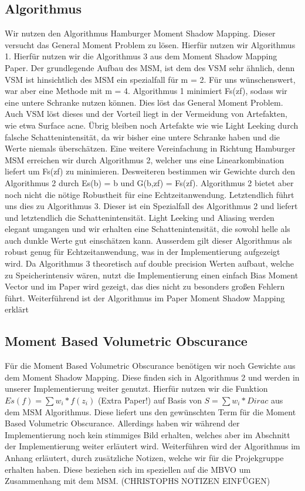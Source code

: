 \documentclass[runningheaders,a4paper]{llncs}
\begin{document}
\subsection{Algorithmus}
Wir nutzen den Algorithmus Hamburger Moment Shadow Mapping. Dieser versucht das General Moment Problem\cite{msm} zu lösen. Hierfür nutzen wir Algorithmus 1. Hierfür nutzen wir die Algorithmus 3 aus dem Moment Shadow Mapping Paper. Der grundlegende Aufbau des MSM, ist dem des VSM sehr ähnlich, denn VSM ist hinsichtlich des MSM ein spezialfall für m = 2. Für uns wünschenswert, war aber eine Methode mit m = 4.
Algorithmus 1 minimiert Fs(zf), sodass wir eine untere Schranke nutzen können. Dies löst das General Moment Problem. Auch VSM löst dieses und der Vorteil liegt in der Vermeidung von Artefakten, wie etwa Surface acne. Übrig bleiben noch Artefakte wie wie Light Leeking durch falsche Schattenintensität, da wir bisher eine untere Schranke haben und die Werte niemals überschätzen. Eine weitere Vereinfachung in Richtung Hamburger MSM erreichen wir durch Algorithmus 2, welcher uns eine Linearkombination liefert um Fs(zf) zu minimieren. Desweiteren bestimmen wir Gewichte durch den Algorithmus 2 durch Es(b) = b und G(b,zf) = Fs(zf). Algorithmus 2 bietet aber noch nicht die nötige Robustheit für eine Echtzeitanwendung.\cite{msm}
Letztendlich führt uns dies zu Algorithmus 3. Dieser ist ein Spezialfall des Algorithmus 2 und liefert und letztendlich die Schattenintensität. Light Leeking und Aliasing werden elegant umgangen und wir erhalten eine Schattenintensität, die sowohl helle als auch dunkle Werte gut einschätzen kann. Ausserdem gilt dieser Algorithmus als robust genug für Echtzeitanwendung, was in der Implementierung aufgezeigt wird. Da Algorithmus 3 theoretisch auf double precision Werten aufbaut, welche zu Speicherintensiv wären, nutzt die Implementierung einen einfach Bias Moment Vector und im Paper wird gezeigt, das dies nicht zu besonders großen Fehlern führt. Weiterführend ist der Algorithmus im Paper Moment Shadow Mapping erklärt\cite{msm}
\subsection{Moment Based Volumetric Obscurance}
Für die Moment Based Volumetric Obscurance benötigen wir noch Gewichte aus dem Moment Shadow Mapping. Diese finden sich in Algorithmus 2 und werden in unserer Implementierung weiter genutzt.
Hierfür nutzen wir die Funktion $Es(f) = \sum w_i*f(z_i)$ (Extra Paper!) auf Basis von $S = \sum w_i*Dirac$ aus dem MSM Algorithmus. Diese liefert uns den gewünschten Term für die Moment Based Volumetric Obscurance. Allerdings haben wir während der Implementierung noch kein stimmiges Bild erhalten, welches aber im Abschnitt der Implementierung weiter erläutert wird. Weiterführen wird der Algorithmus im Anhang erläutert, durch zusätzliche Notizen, welche wir für die Projekgruppe erhalten haben. Diese beziehen sich im speziellen auf die MBVO um Zusammenhang mit dem MSM. (CHRISTOPHS NOTIZEN EINFÜGEN)
\end{document}
